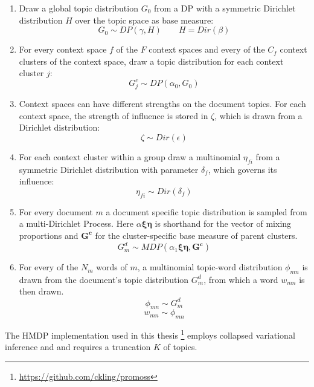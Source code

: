 \begin{enumerate}
\item Draw a global topic distribution $G_0$ from a DP with a symmetric Dirichlet distribution $H$ over the topic space as base measure:
\begin{equation}
G_0 \sim DP(\gamma, H) \quad \quad H = Dir(\beta)
\end{equation}
\item For every context space $f$ of the $F$ context spaces and every of the $C_f$ context clusters of the context space, draw a topic distribution for each context cluster $j$:
\begin{equation}
G_j^c \sim DP(\alpha_0,G_0)
\end{equation}
\item Context spaces can have different strengths on the document topics. For each context space, the strength of influence is stored in $\zeta$, which is drawn from a Dirichlet distribution:
\begin{equation}
\zeta \sim Dir(\epsilon)
\end{equation}
\item For each context cluster within a group draw a multinomial $\eta_{fi}$ from a symmetric Dirichlet distribution with parameter $\delta_f$, which governs its influence:
\begin{equation}
\eta_{fi} \sim Dir(\delta_f)
\end{equation}
\item For every document $m$ a document specific topic distribution is sampled from a multi-Dirichlet Process. Here $\alpha\boldsymbol{\xi\eta}$ is shorthand for the vector of mixing proportions and $\boldsymbol{G^c}$ for the cluster-specific base measure of parent clusters.
\begin{equation}
G_m^d \sim MDP(\alpha_1\boldsymbol{\xi\eta},\boldsymbol{G^c})
\end{equation}
\item For every of the $N_m$ words of $m$, a multinomial topic-word distribution $\phi_{mn}$ is drawn from the document's topic distribution $G_m^d$, from which a word $w_{mn}$ is then drawn.
\begin{equation}
\phi_{mn} \sim G_m^d
\end{equation}
\begin{equation}
w_{mn} \sim \phi_{mn}
\end{equation}
\end{enumerate}
\par
The HMDP implementation used in this thesis \footnote{\url{https://github.com/ckling/promoss}} employs collapsed variational inference and and requires a truncation $K$ of topics.

